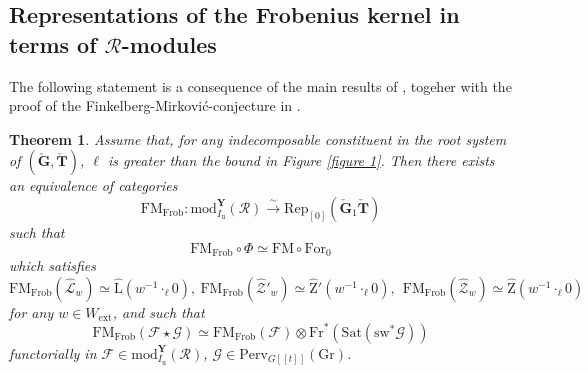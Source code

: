 \documentclass[11pt]{amsart}
\theoremstyle{plain}
\newtheorem{thm}{Theorem}[section]
\theoremstyle{remark}
\numberwithin{equation}{section}
\begin{document}
	\subsection{Representations of the Frobenius kernel in terms of $\mathcal{R}$-modules}\label{section Representations of the Frobenius kernel in terms of}
 The following statement is a consequence of the main results of \cite{achar2022geometric}, togeher with the proof of the Finkelberg-Mirkovi\'c-conjecture in \cite{bezrukavnikov2024modular}.
 \begin{thm}{{\cite[Proposition 1.3]{achar2022geometric}}}\label{thm BR}
     Assume that, for any indecomposable constituent in the root system of $(\check{\mathbf{G}},\check{\mathbf{T}})$, $\ell$ is greater than the bound in Figure \ref{figure 1}. Then there exists an equivalence of categories
     $$\mathrm{FM}_{\mathrm{Frob}}:\mathrm{mod}^\mathbf{Y}_{I_\mathrm{u}}(\mathcal{R})\xrightarrow{\sim} \mathrm{Rep}_{[0]}(\check{\mathbf{G}}_1\check{\mathbf{T}})$$
     such that 
     $$\mathrm{FM}_{\mathrm{Frob}}\circ\Phi\simeq\mathrm{FM}\circ\mathrm{For}_0$$
     which satisfies
     $$\mathrm{FM}_{\mathrm{Frob}}(\widehat{\mathcal{L}}_w)\simeq \widehat{\mathrm{L}}(w^{-1}\cdot_\ell0),~\mathrm{FM}_{\mathrm{Frob}}(\widehat{\mathcal{Z}}'_w)\simeq \widehat{\mathrm{Z}}'(w^{-1}\cdot_\ell0),~~\mathrm{FM}_{\mathrm{Frob}}(\widehat{\mathcal{Z}}_w)\simeq \widehat{\mathrm{Z}}(w^{-1}\cdot_\ell0) $$
     for any $w\in W_\mathrm{ext}$, and such that
     $$\mathrm{FM}_{\mathrm{Frob}}(\mathcal{F}\star\mathcal{G})\simeq\mathrm{FM}_{\mathrm{Frob}}(\mathcal{F})\otimes\mathrm{Fr}^*(\mathrm{Sat}(\mathrm{sw}^*\mathcal{G})) $$
     functorially in $\mathcal{F}\in \mathrm{mod}^\mathbf{Y}_{I_\mathrm{u}}(\mathcal{R})$, $\mathcal{G}\in\mathrm{Perv}_{G[[t]]}(\mathrm{Gr})$.
 \end{thm}
\end{document}
